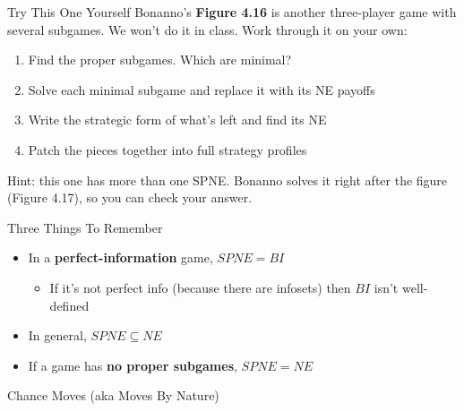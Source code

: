 \begin{frame}{Try This One Yourself}
Bonanno's \textbf{Figure 4.16} is another three-player game with several subgames.
\bsk
We won't do it in class. Work through it on your own:
\bsk
\begin{enumerate}
    \item Find the proper subgames. Which are minimal?
    \bsk
    \item Solve each minimal subgame and replace it with its NE payoffs
    \bsk
    \item Write the strategic form of what's left and find its NE
    \bsk
    \item Patch the pieces together into full strategy profiles
\end{enumerate}
\vfill
Hint: this one has more than one SPNE.
\bsk
{\footnotesize Bonanno solves it right after the figure (Figure 4.17), so you can check your answer.}
\vspace{-0.3in}
\end{frame}

\begin{frame}{Three Things To Remember}
\begin{itemize}
    \item In a \textbf{perfect-information} game, $SPNE=BI$
    \begin{itemize}
        \item If it's not perfect info (because there are infosets) then $BI$ isn't well-defined
    \end{itemize}
    \vspace{0.25in}
    \item In general, $SPNE\subseteq NE$ \vspace{0.25in}
    \item If a game has \textbf{no proper subgames}, $SPNE=NE$
      \vspace{0.25in}
\end{itemize}
\vfill
\vspace{-0.3in}
\end{frame}


\begin{frame}[standout]
Chance Moves (aka Moves By Nature)
\end{frame}

